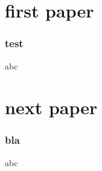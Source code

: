 \documentclass{beamer}
\begin{document}
\part{first paper}  

\section{test}
\begin{frame}
    abc
\end{frame} 

\part{next paper}

\section{bla}
\begin{frame}
    abc
\end{frame}
\end{document}
